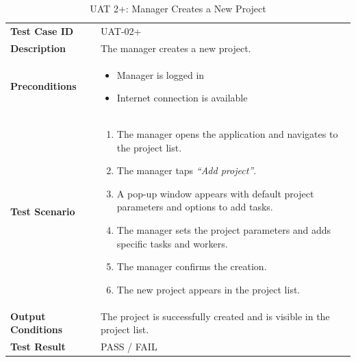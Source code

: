 \documentclass[12pt,a4paper]{article}
\begin{document}
\begin{table}[h]
\centering
\caption{UAT 2+: Manager Creates a New Project}
\begin{tabularx}{\textwidth}{>{\bfseries}l X}
\toprule
Test Case ID & UAT-02+ \\
Description & The manager creates a new project. \\
Preconditions &
\begin{itemize}[noitemsep]
    \item Manager is logged in
    \item Internet connection is available
\end{itemize} \\
Test Scenario &
\begin{enumerate}[noitemsep]
    \item The manager opens the application and navigates to the project list.
    \item The manager taps \emph{``Add project''}.
    \item A pop-up window appears with default project parameters and options to add tasks.
    \item The manager sets the project parameters and adds specific tasks and workers.
    \item The manager confirms the creation.
    \item The new project appears in the project list.
\end{enumerate} \\
Output Conditions & The project is successfully created and is visible in the project list. \\
Test Result & PASS / FAIL \\
\bottomrule
\end{tabularx}
\end{table}
\end{document}

